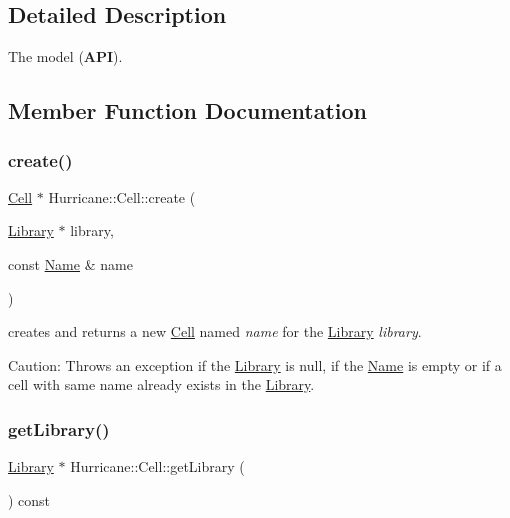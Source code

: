 \subsection{Detailed Description}
The model ({\bfseries A\+PI}). 

\subsection{Member Function Documentation}
\mbox{\label{classHurricane_1_1Cell_ad803afb3e52bea3bf3d520e353b162e0}} 
\subsubsection{\texorpdfstring{create()}{create()}}
{\footnotesize\ttfamily \hyperlink{classHurricane_1_1Cell}{Cell} $\ast$ Hurricane\+::\+Cell\+::create (\begin{DoxyParamCaption}\item[{\hyperlink{classHurricane_1_1Library}{Library} $\ast$}]{library,  }\item[{const \hyperlink{classHurricane_1_1Name}{Name} \&}]{name }\end{DoxyParamCaption})\hspace{0.3cm}{\ttfamily [static]}}

creates and returns a new \hyperlink{classHurricane_1_1Cell}{Cell} named {\itshape name} for the \hyperlink{classHurricane_1_1Library}{Library} {\itshape library}.

\begin{DoxyParagraph}{Caution\+:}
Throws an exception if the \hyperlink{classHurricane_1_1Library}{Library} is null, if the \hyperlink{classHurricane_1_1Name}{Name} is empty or if a cell with same name already exists in the \hyperlink{classHurricane_1_1Library}{Library}. 
\end{DoxyParagraph}
\mbox{\label{classHurricane_1_1Cell_aa84b97773160a28d3dd69df1e261eecf}} 
\subsubsection{\texorpdfstring{get\+Library()}{getLibrary()}}
{\footnotesize\ttfamily \hyperlink{classHurricane_1_1Library}{Library} $\ast$ Hurricane\+::\+Cell\+::get\+Library (\begin{DoxyParamCaption}{ }\end{DoxyParamCaption}) const\hspace{0.3cm}{\ttfamily [inline]}}

